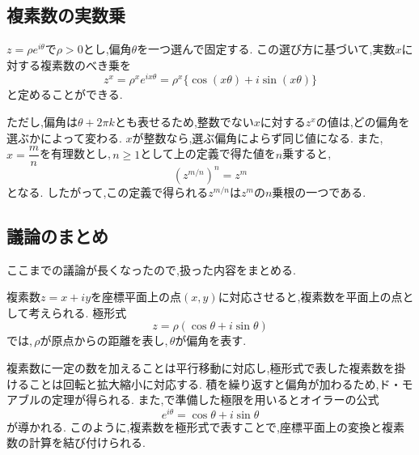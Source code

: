   \subsection{複素数の実数乗}\label{節：複素数の実数乗}
    $z=\rho e^{i\theta}$で$\rho>0$とし,偏角$\theta$を一つ選んで固定する.
    この選び方に基づいて,実数$x$に対する複素数のべき乗を
    \[
      z^x=\rho^x e^{ix\theta}
      =
      \rho^x\{\cos(x\theta)+i\sin(x\theta)\}
    \]
    と定めることができる.

    ただし,偏角は$\theta+2\pi k$とも表せるため,整数でない$x$に対する$z^x$の値は,どの偏角を選ぶかによって変わる.
    $x$が整数なら,選ぶ偏角によらず同じ値になる.
    また,\,$x=\dfrac{m}{n}$を有理数とし,\,$n\ge1$として上の定義で得た値を$n$乗すると,
    \[
      (z^{m/n})^n=z^m
    \]
    となる.
    したがって,この定義で得られる$z^{m/n}$は$z^m$の$n$乗根の一つである.

    \subsection{議論のまとめ}\label{節：議論のまとめ}
    ここまでの議論が長くなったので,扱った内容をまとめる.

    複素数$z=x+iy$を座標平面上の点$(x,y)$に対応させると,複素数を平面上の点として考えられる.
    極形式
    \[
      z=\rho(\cos\theta+i\sin\theta)
    \]
    では,\,$\rho$が原点からの距離を表し,\,$\theta$が偏角を表す.

    複素数に一定の数を加えることは平行移動に対応し,極形式で表した複素数を掛けることは回転と拡大縮小に対応する.
    積を繰り返すと偏角が加わるため,ド・モアブルの定理が得られる.
    また,で準備した極限を用いるとオイラーの公式
    \[
      e^{i\theta}=\cos\theta+i\sin\theta
    \]
    が導かれる.
    このように,複素数を極形式で表すことで,座標平面上の変換と複素数の計算を結び付けられる.